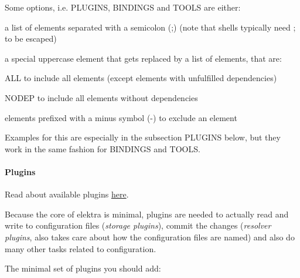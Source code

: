 Some options, i.\+e. {\ttfamily P\+L\+U\+G\+I\+NS}, {\ttfamily B\+I\+N\+D\+I\+N\+GS} and {\ttfamily T\+O\+O\+LS} are either\+:


\begin{DoxyItemize}
\item a list of elements separated with a semicolon ({\ttfamily ;}) (note that shells typically need {\ttfamily ;} to be escaped)
\item a special uppercase element that gets replaced by a list of elements, that are\+:
\begin{DoxyItemize}
\item {\ttfamily A\+LL} to include all elements (except elements with unfulfilled dependencies)
\item {\ttfamily N\+O\+D\+EP} to include all elements without dependencies
\end{DoxyItemize}
\item elements prefixed with a minus symbol ({\ttfamily -\/}) to exclude an element
\end{DoxyItemize}

Examples for this are especially in the subsection {\ttfamily P\+L\+U\+G\+I\+NS} below, but they work in the same fashion for {\ttfamily B\+I\+N\+D\+I\+N\+GS} and {\ttfamily T\+O\+O\+LS}.

\paragraph*{Plugins}

Read about available plugins \hyperlink{src_plugins_README_md}{here}.

Because the core of elektra is minimal, plugins are needed to actually read and write to configuration files ({\itshape storage plugins}), commit the changes ({\itshape resolver plugins}, also takes care about how the configuration files are named) and also do many other tasks related to configuration.

The minimal set of plugins you should add\+:


